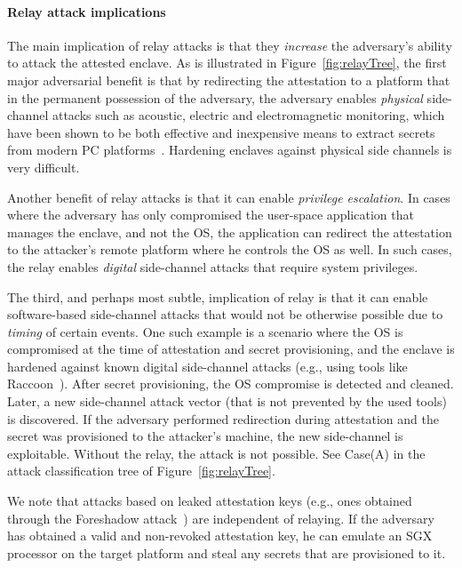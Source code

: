 \paragraph{Relay attack implications}
The main implication of relay attacks is that they \emph{increase} the adversary's ability to attack the attested enclave. As is illustrated in Figure~\ref{fig:relayTree}, the first major adversarial benefit is that by redirecting the attestation to a platform that in the permanent possession of the adversary, the adversary enables \emph{physical} side-channel attacks such as acoustic, electric and electromagnetic monitoring, which have been shown to be both effective and inexpensive means to extract secrets from modern PC platforms~\cite{genkin2016physical}. Hardening enclaves against physical side channels is very difficult. 

Another benefit of relay attacks is that it can enable \emph{privilege escalation}. In cases where the adversary has only compromised the user-space application that manages the enclave, and not the OS, the application can redirect the attestation to the attacker's remote platform where he controls the OS as well. In such cases, the relay enables \emph{digital} side-channel attacks that require system privileges.

The third, and perhaps most subtle, implication of relay is that it can enable software-based side-channel attacks that would not be otherwise possible due to \emph{timing} of certain events. One such example is a scenario where the OS is compromised at the time of attestation and secret provisioning, and the enclave is hardened against known digital side-channel attacks (e.g., using tools like Raccoon~\cite{raccoon}). After secret provisioning, the OS compromise is detected and cleaned. Later, a new side-channel attack vector (that is not prevented by the used tools) is discovered. If the adversary performed redirection during attestation and the secret was provisioned to the attacker's machine, the new side-channel is exploitable. Without the relay, the attack is not possible. See Case(A) in the attack classification tree of Figure~\ref{fig:relayTree}.

We note that attacks based on leaked attestation keys (e.g., ones obtained through the Foreshadow attack~\cite{van2018foreshadow}) are independent of relaying. If the adversary has obtained a valid and non-revoked attestation key, he can emulate an SGX processor on the target platform and steal any secrets that are provisioned to it.


